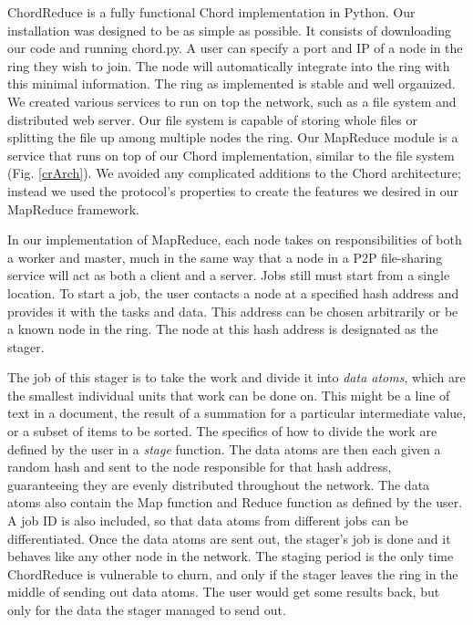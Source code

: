 \documentclass[10pt, conference, compsocconf]{IEEEtran}
\begin{document}
ChordReduce is a fully functional Chord implementation in Python.  Our installation was designed to be as simple as possible.  It consists of downloading our code \cite{code} and running chord.py.  A user can specify a port and IP of a node in the ring they wish to join.  The node will automatically integrate into the ring with this minimal information.  The ring as implemented is stable and well organized.  We created various services to run on top the network, such as a file system and distributed web server.  Our file system is capable of storing whole files or splitting the file up among multiple nodes the ring.  Our MapReduce module is a service that runs on top of our Chord implementation, similar to the file system (Fig. \ref{crArch}).  We avoided any complicated additions to the Chord architecture; instead we used the protocol's properties to create the features we desired in our MapReduce framework. 
  
In our implementation of MapReduce, each node takes on responsibilities of both a worker and master, much in the same way that a node in a P2P file-sharing service will act as both a client and a server.  Jobs still must start from a single location.  To start a job, the user contacts a node at a specified hash address and provides it with the tasks and data.  This address can be chosen arbitrarily or be a known node in the ring. The node at this hash address is designated as the stager.  

The job of this stager is to take the work and divide it into \emph{data atoms}, which are the smallest individual units that work can be done on.  This might be a line of text in a document, the result of a summation for a particular intermediate value, or a subset of items to be sorted.  The specifics of how to divide the work are defined by the user in a \emph{stage} function.  The data atoms are then each given a random hash and sent to the node responsible for that hash address, guaranteeing they are evenly distributed throughout the network.  The data atoms also contain the Map function and Reduce function as defined by the user.  A job ID is also included, so that data atoms from different jobs can be differentiated.  Once the data atoms are sent out, the stager's job is done and it behaves like any other node in the network. The staging period is the only time ChordReduce is vulnerable to churn, and only if the stager leaves the ring in the middle of sending out data atoms.  The user would get some results back, but only for the data the stager managed to send out.
\end{document}
